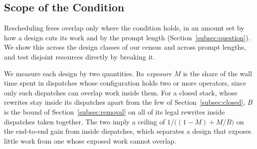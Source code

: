 \subsection{Scope of the Condition}
\label{subsec:pays}
\label{subsec:clause}

Rescheduling frees overlap only where the condition holds, in an amount set by how a design cuts its work and by the prompt length (Section~\ref{subsec:question}).
We show this across the design classes of our census and across prompt lengths, and test disjoint resources directly by breaking it.

\label{subsec:exposure}
We measure each design by two quantities.
Its \emph{exposure} $M$ is the share of the wall time spent in dispatches whose configuration holds two or more operators, since only such dispatches can overlap work inside them.
For a closed stack, whose rewrites stay inside its dispatches apart from the few of Section~\ref{subsec:closed}, $B$ is the bound of Section~\ref{subsec:removal} on all of its legal rewrites inside dispatches taken together.
The two imply a ceiling of $1 / \bigl((1 - M) + M / B\bigr)$ on the end-to-end gain from inside dispatches, which separates a design that exposes little work from one whose exposed work cannot overlap.

